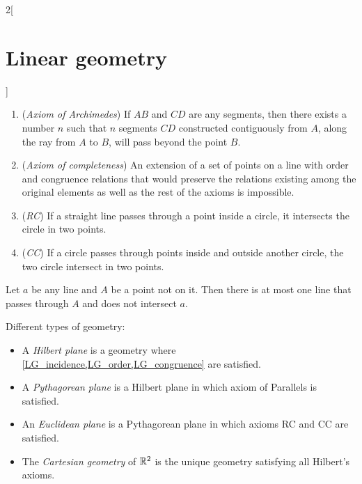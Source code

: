 \documentclass[../../../main_math.tex]{subfiles}
\begin{document}
\begin{multicols}{2}[\section{Linear geometry}]
\begin{axiom}
    \hfill
    \begin{enumerate}
      \item (\emph{Axiom of Archimedes}) If $AB$ and $CD$ are any segments, then there exists a number $n$ such that $n$ segments $CD$ constructed contiguously from $A$, along the ray from $A$ to $B$, will pass beyond the point $B$.
      \item (\emph{Axiom of completeness}) An extension of a set of points on a line with order and congruence relations that would preserve the relations existing among the original elements as well as the rest of the axioms is impossible.
      \item (\emph{RC}) If a straight line passes through a point inside a circle, it intersects the circle in two points.
      \item (\emph{CC}) If a circle passes through points inside and outside another circle, the two circle intersect in two points.
    \end{enumerate}
  \end{axiom}
  \begin{axiom}
    Let $a$ be any line and $A$ be a point not on it. Then there is at most one line that passes through $A$ and does not intersect $a$.
  \end{axiom}
  \begin{definition}
    Different types of geometry:
    \begin{itemize}
      \item A \emph{Hilbert plane} is a geometry where \cref{LG_incidence,LG_order,LG_congruence} are satisfied.
      \item A \emph{Pythagorean plane} is a Hilbert plane in which axiom of Parallels is satisfied.
      \item An \emph{Euclidean plane} is a Pythagorean plane in which axioms RC and CC are satisfied.
      \item The \emph{Cartesian geometry} of $\mathbb{R}^2$ is the unique geometry satisfying all Hilbert's axioms.
    \end{itemize}
  \end{definition}

\end{multicols}
\end{document}
